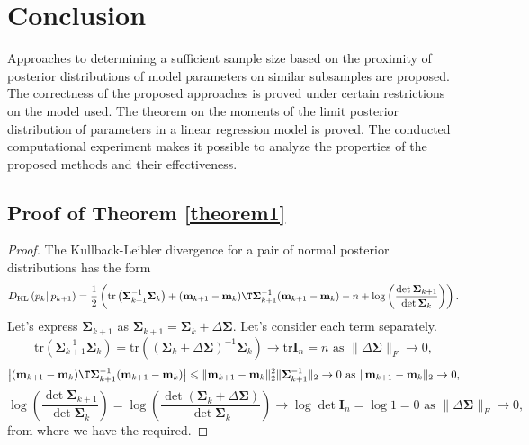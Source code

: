\documentclass[sn-mathphys-num]{sn-jnl}%
\begin{document}
\section{Conclusion}

Approaches to determining a sufficient sample size based on the proximity of posterior distributions of model parameters on similar subsamples are proposed. The correctness of the proposed approaches is proved under certain restrictions on the model used. The theorem on the moments of the limit posterior distribution of parameters in a linear regression model is proved. The conducted computational experiment makes it possible to analyze the properties of the proposed methods and their effectiveness.

\begin{appendices}

\section{Proof of Theorem \ref{theorem1}}
\begin{proof}
The Kullback-Leibler divergence for a pair of normal posterior distributions has the form
    \[ D_{\text{KL}}\left( p_k \| p_{k+1} \right) = \dfrac{1}{2} \left( \mathrm{tr}\left( \mathbf{\Sigma}_{k+1}^{-1} \mathbf{\Sigma}_k \right) + (\mathbf{m}_{k+1} - \mathbf{m}_k)\T \mathbf{\Sigma}_{k+1}^{-1} (\mathbf{m}_{k+1} - \mathbf{m}_k) - n + \log{\left( \dfrac{\det \mathbf{\Sigma}_{k+1}}{\det \mathbf{\Sigma}_{k}} \right)} \right). \]
    Let's express $\mathbf{\Sigma}_{k+1}$ as $\mathbf{\Sigma}_{k+1} = \mathbf{\Sigma}_k + \Delta\mathbf{\Sigma}$. Let's consider each term separately.
    \[ \mathrm{tr}\left( \mathbf{\Sigma}_{k+1}^{-1} \mathbf{\Sigma}_k \right) = \mathrm{tr}\left(\left(\mathbf{\Sigma}_k + \Delta \mathbf{\Sigma} \right)^{-1} \mathbf{\Sigma}_k \right) \to \mathrm{tr}\mathbf{I}_n=n\text{ as } \| \Delta \mathbf{\Sigma} \|_F \to 0, \]
    \[ \left| (\mathbf{m}_{k+1} - \mathbf{m}_k)\T\mathbf{\Sigma}_{k+1}^{-1} (\mathbf{m}_{k+1} - \mathbf{m}_k) \right| \leqslant\| \mathbf{m}_{k+1} -\mathbf{m}_k\|_2^2\|\mathbf{\Sigma}_{k+1}^{-1} \|_2 \to 0 \text{ as } \| \mathbf{m}_{k+1} - \mathbf{m}_k\|_2 \to 0, \]
    \[ \log{\left( \dfrac{\det \mathbf{\Sigma}_{k+1}}{\det \mathbf{\Sigma}_{k}} \right)} = \log{\left( \dfrac{\det \left( \mathbf{\Sigma}_k + \Delta \mathbf{\Sigma} \right)}{\det\mathbf{\Sigma}_{k}} \right)} \to \log \det\mathbf{I}_n = \log 1 = 0 \text{ as } \| \Delta \mathbf{\Sigma} \|_F\to 0, \]
    from where we have the required.
\end{proof}


\end{appendices}
\end{document}
